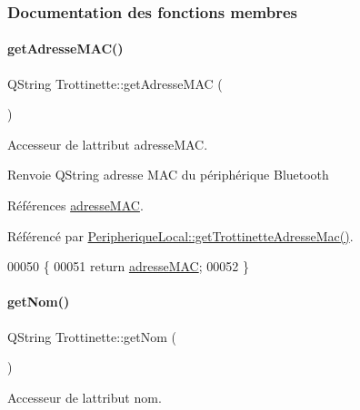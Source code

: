 \subsubsection{Documentation des fonctions membres}
\mbox{\label{class_trottinette_a4d319bfda23b3d871b62e3e910cc204d}} 
\paragraph{\texorpdfstring{get\+Adresse\+M\+A\+C()}{getAdresseMAC()}}
{\footnotesize\ttfamily Q\+String Trottinette\+::get\+Adresse\+M\+AC (\begin{DoxyParamCaption}{ }\end{DoxyParamCaption})}

Accesseur de l\textquotesingle{}attribut adresse\+M\+AC.

\begin{DoxyReturn}{Renvoie}
Q\+String adresse M\+AC du périphérique Bluetooth 
\end{DoxyReturn}


Références \hyperlink{class_trottinette_acd01acc5c1cbf23b9b527401282f1136}{adresse\+M\+AC}.



Référencé par \hyperlink{class_peripherique_local_a465658a204541e309f2647d473f658d8}{Peripherique\+Local\+::get\+Trottinette\+Adresse\+Mac()}.


\begin{DoxyCode}
00050 \{
00051     \textcolor{keywordflow}{return} \hyperlink{class_trottinette_acd01acc5c1cbf23b9b527401282f1136}{adresseMAC};
00052 \}
\end{DoxyCode}
\mbox{\label{class_trottinette_a9b191a43bacb534dca0727aedd3076cd}} 
\paragraph{\texorpdfstring{get\+Nom()}{getNom()}}
{\footnotesize\ttfamily Q\+String Trottinette\+::get\+Nom (\begin{DoxyParamCaption}{ }\end{DoxyParamCaption})}

Accesseur de l\textquotesingle{}attribut nom.

